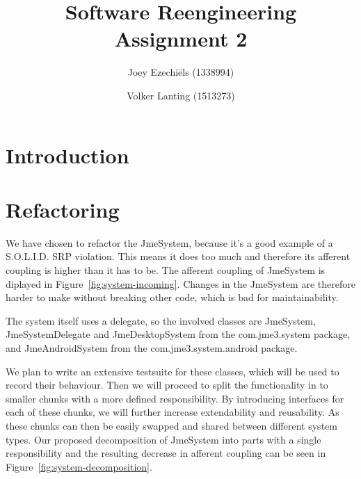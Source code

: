 \documentclass[a4paper, 10pt]{article}
\title{Software Reengineering\\
       Assignment 2}
\author{Joey Ezechi\"{e}ls (1338994) \and Volker Lanting (1513273)}
\begin{document}
\maketitle %

\newpage
\tableofcontents %


\newpage
{}
\section{Introduction}


\section{Refactoring}
We have chosen to refactor the JmeSystem, 
because it's a good example of a S.O.L.I.D. SRP violation.
This means it does too much and therefore its afferent coupling is higher than it has to be.
The afferent coupling of JmeSystem is diplayed in Figure~\ref{fig:system-incoming}.
Changes in the JmeSystem are therefore harder to make without breaking other code,
which is bad for maintainability.

	The system itself uses a delegate, so the involved classes are JmeSystem, JmeSystemDelegate and JmeDesktopSystem from the com.jme3.system package, and JmeAndroidSystem from the com.jme3.system.android package.

	We plan to write an extensive testsuite for these classes, which will be used to record their behaviour.
	Then we will proceed to split the functionality in to smaller chunks with a more defined responsibility.
	By introducing interfaces for each of these chunks, we will further increase extendability and reusability.
	As these chunks can then be easily swapped and shared between different system types.
	Our proposed decomposition of JmeSystem into parts with a single responsibility and the resulting decrease in afferent coupling
	can be seen in Figure~\ref{fig:system-decomposition}.
\end{document}
